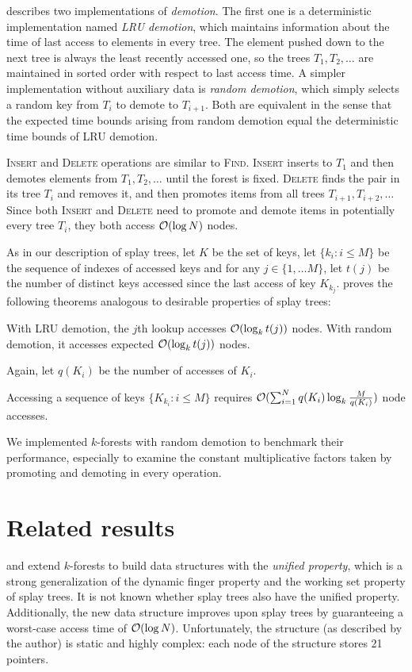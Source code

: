 \cite{martel} describes two implementations of \emph{demotion}.
The first one is a deterministic implementation named \emph{LRU demotion},
which maintains information about the time of last access to elements
in every tree. The element pushed down to the next tree is always the least
recently accessed one, so the trees $T_1,T_2,\ldots$ are maintained in sorted
order with respect to last access time.
A simpler implementation without auxiliary data is \emph{random demotion},
which simply selects a random key from $T_i$ to demote to $T_{i+1}$.
Both are equivalent in the sense that the expected time bounds arising
from random demotion equal the deterministic time bounds of LRU demotion.

\textsc{Insert} and \textsc{Delete} operations are similar to \textsc{Find}.
\textsc{Insert} inserts to $T_1$ and then demotes elements from $T_1,T_2,\ldots$
until the forest is fixed.
\textsc{Delete} finds the pair in its tree $T_i$ and removes it, and
then promotes items from all trees $T_{i+1},T_{i+2},\ldots$
Since both \textsc{Insert} and \textsc{Delete} need to promote and demote items
in potentially every tree $T_i$, they both access $\mathcal{O}(\log N)$ nodes.

As in our description of splay trees, let $K$ be the set of keys,
let $\{k_i: i\leq M\}$ be the sequence of indexes of accessed keys and
for any $j\in\{1,\ldots M\}$, let $t(j)$ be the number of distinct
keys accessed since the last access of key $K_{k_j}$.
\cite{martel} proves the following theorems analogous to desirable properties
of splay trees:
\begin{theorem}
	With LRU demotion, the $j$th lookup accesses $\mathcal{O}(\log_k t(j))$ nodes.
	With random demotion, it accesses expected $\mathcal{O}(\log_k t(j))$ nodes.
\end{theorem}

Again, let $q(K_i)$ be the number of accesses of $K_i$.
\begin{theorem}
	Accessing a sequence of keys $\{K_{k_i}: i\leq M\}$ requires
	$\mathcal{O}(\sum_{i=1}^N q(K_i) \log_k \frac{M}{q(K_i)})$ node accesses.
\end{theorem}

We implemented $k$-forests with random demotion to benchmark their performance,
especially to examine the constant multiplicative factors taken by promoting
and demoting in every operation.

\section{Related results}
\cite{alternatives-to-splay-trees} and \cite{unified-access-bound} extend
$k$-forests to build data structures with the \emph{unified property},
which is a strong generalization of the dynamic finger property and the working
set property of splay trees.
It is not known whether splay trees also have the unified property.
Additionally, the new data structure improves upon splay trees by guaranteeing
a worst-case access time of $\mathcal{O}(\log N)$. Unfortunately, the structure
(as described by the author) is static and highly complex: each node of
the structure stores 21 pointers.

